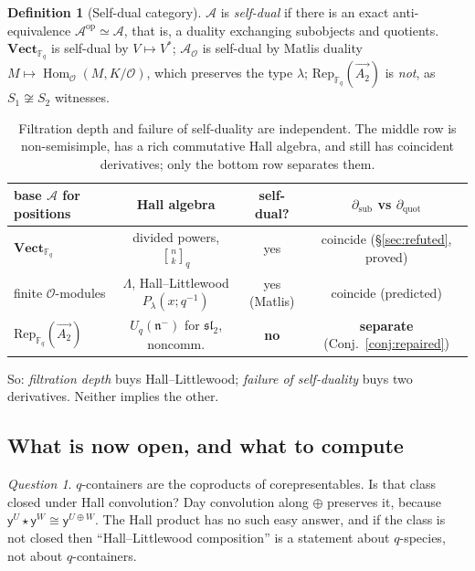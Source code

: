 \documentclass[11pt,a4paper]{article}
\theoremstyle{definition}
\newtheorem{definition}[theorem]{Definition}
\theoremstyle{remark}
\newtheorem{question}[theorem]{Question}
\newcommand{\FF}{\mathbb{F}}
\newcommand{\cat}[1]{\mathbf{#1}}
\newcommand{\Vect}{\cat{Vect}}
\newcommand{\Rep}{\mathrm{Rep}}
\newcommand{\op}{\mathrm{op}}
\DeclareMathOperator{\Hom}{Hom}
\newcommand{\qbin}[2]{\genfrac{[}{]}{0pt}{}{#1}{#2}_{q}}
\newcommand{\yon}{\mathsf{y}}
\begin{document}
\begin{definition}[Self-dual category]
$\mathcal{A}$ is \emph{self-dual} if there is an exact anti-equivalence
$\mathcal{A}^{\op} \simeq \mathcal{A}$, that is, a duality exchanging subobjects
and quotients. $\Vect_{\FF_q}$ is self-dual by $V \mapsto V^{*}$;
$\mathcal{A}_{\mathcal{O}}$ is self-dual by Matlis duality
$M \mapsto \Hom_{\mathcal{O}}(M, K/\mathcal{O})$, which preserves the type
$\lambda$; $\Rep_{\FF_q}(\vec{A_2})$ is \emph{not}, as $S_1 \not\cong S_2$
witnesses.
\end{definition}

\begin{table}[h]
\centering
\small
\setlength{\tabcolsep}{5pt}
\begin{tabular}{lccc}
\toprule
base $\mathcal{A}$ for positions & Hall algebra & self-dual? & $\partial_{\mathrm{sub}}$ vs $\partial_{\mathrm{quot}}$ \\
\midrule
$\Vect_{\FF_q}$
  & divided powers, $\qbin{n}{k}$ & yes & coincide (\S\ref{sec:refuted}, proved) \\
finite $\mathcal{O}$-modules
  & $\Lambda$, Hall--Littlewood $P_\lambda(x;q^{-1})$ & yes (Matlis) & coincide (predicted) \\
$\Rep_{\FF_q}(\vec{A_2})$
  & $U_q(\mathfrak{n}^{-})$ for $\mathfrak{sl}_2$, noncomm. & \textbf{no} & \textbf{separate} (Conj.~\ref{conj:repaired}) \\
\bottomrule
\end{tabular}
\caption{Filtration depth and failure of self-duality are independent. The middle
row is non-semisimple, has a rich commutative Hall algebra, and still has
coincident derivatives; only the bottom row separates them.}
\label{tab:threebases}
\end{table}

\noindent
So: \emph{filtration depth} buys Hall--Littlewood; \emph{failure of self-duality}
buys two derivatives. Neither implies the other.

\subsection{What is now open, and what to compute}

\begin{question}\label{q:closed}
$q$-containers are the coproducts of corepresentables. Is that class closed under
Hall convolution? Day convolution along $\oplus$ preserves it, because
$\yon^{U} \star \yon^{W} \cong \yon^{U \oplus W}$. The Hall product has no such
easy answer, and if the class is not closed then ``Hall--Littlewood composition''
is a statement about $q$-species, not about $q$-containers.
\end{question}
\end{document}
